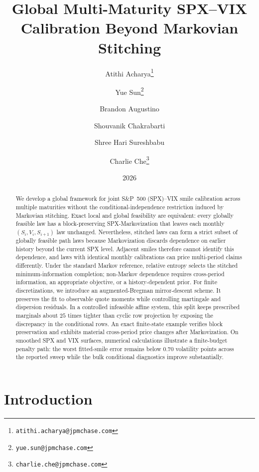 \documentclass{article}
\title{Global Multi-Maturity SPX--VIX Calibration Beyond Markovian Stitching}
\author[1]{Atithi Acharya\thanks{\texttt{atithi.acharya@jpmchase.com}}}
\author[1]{Yue Sun\thanks{\texttt{yue.sun@jpmchase.com}}}
\author[1]{Brandon Augustino}
\author[1]{Shouvanik Chakrabarti}
\author[1]{Shree Hari Sureshbabu}
\author[2]{Charlie Che\thanks{\texttt{charlie.che@jpmchase.com}}}
\affil[1]{Global Technology Applied Research, JPMorganChase, New York, NY 10001, USA}
\affil[2]{Quantitative Trading \& Research, JPMorganChase, New York, NY 10179, USA}
\date{2026}
\renewcommand{\thefootnote}{\fnsymbol{footnote}}
\begin{document}
\maketitle
\renewcommand{\thefootnote}{\arabic{footnote}}\setcounter{footnote}{0}

\begin{abstract}
We develop a global framework for joint S\&P~500 (SPX)--VIX smile calibration across multiple maturities without the conditional-independence restriction induced by Markovian stitching.
Exact local and global feasibility are equivalent: every globally feasible law has a block-preserving SPX-Markovization that leaves each monthly $(S_i,V_i,S_{i+1})$ law unchanged.
Nevertheless, stitched laws can form a strict subset of globally feasible path laws because Markovization discards dependence on earlier history beyond the current SPX level.
Adjacent smiles therefore cannot identify this dependence, and laws with identical monthly calibrations can price multi-period claims differently.
Under the standard Markov reference, relative entropy selects the stitched minimum-information completion; non-Markov dependence requires cross-period information, an appropriate objective, or a history-dependent prior.
For finite discretizations, we introduce an augmented-Bregman mirror-descent scheme.
It preserves the fit to observable quote moments while controlling martingale and dispersion residuals.
In a controlled infeasible affine system, this split keeps prescribed marginals about $25$ times tighter than cyclic row projection by exposing the discrepancy in the conditional rows.
An exact finite-state example verifies block preservation and exhibits material cross-period price changes after Markovization.
On smoothed SPX and VIX surfaces, numerical calculations illustrate a finite-budget penalty path: the worst fitted-smile error remains below $0.70$ volatility points across the reported sweep while the bulk conditional diagnostics improve substantially.
\end{abstract}

\section{Introduction}\label{sec:intro}
\end{document}
